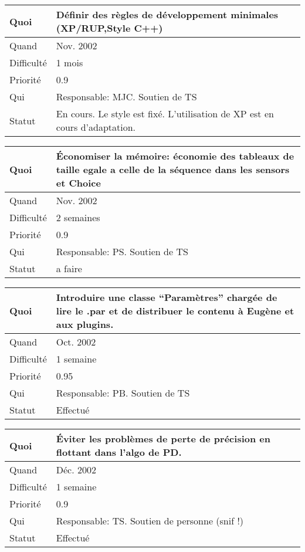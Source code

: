 \documentclass[a4paper,11pt]{article}
\begin{document}
\begin{longtable}{|l|p{7cm}|}\hline
  Quoi & D\'efinir des r\`egles de d\'eveloppement minimales (XP/RUP,Style C++)\\\hline
  Quand  & Nov. 2002 \\\hline
  Difficult\'e & 1 mois \\\hline
  Priorit\'e &  0.9 \\\hline
  Qui & Responsable: MJC. Soutien de TS \\\hline
  Statut & En cours. Le style est fix\'e. L'utilisation de XP est en
  cours d'adaptation.\\\hline
\end{longtable}

\begin{longtable}{|l|p{7cm}|}\hline
  Quoi & \'Economiser la m\'emoire: \'economie des tableaux de taille egale a celle de la s\'equence dans les sensors et Choice \\\hline
  Quand  &  Nov. 2002\\\hline
  Difficult\'e &  2 semaines\\\hline
  Priorit\'e & 0.9 \\\hline
  Qui & Responsable: PS. Soutien de TS\\\hline
  Statut & a faire\\\hline
\end{longtable}

\begin{longtable}{|l|p{7cm}|}\hline
  Quoi & Introduire une classe ``Param\`etres'' charg\'ee de lire le .par
  et de distribuer le contenu \`a Eug\`ene et aux plugins.  \\\hline
  Quand  &  Oct. 2002 \\\hline
  Difficult\'e &  1 semaine \\\hline
  Priorit\'e &  0.95 \\\hline
  Qui & Responsable: PB. Soutien de TS\\\hline
  Statut & Effectu\'e\\\hline
\end{longtable}

\begin{longtable}{|l|p{7cm}|}\hline
  Quoi & \'Eviter les probl\`emes de perte de pr\'ecision en flottant dans
  l'algo de PD.\\\hline
  Quand  &  D\'ec. 2002\\\hline
  Difficult\'e & 1 semaine \\\hline
  Priorit\'e &  0.9 \\\hline
  Qui & Responsable: TS. Soutien de personne (snif !)\\\hline
  Statut & Effectu\'e\\\hline
\end{longtable}
\end{document}
